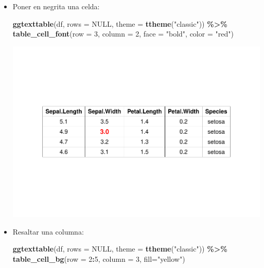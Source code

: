 \documentclass[
]{book}
\newenvironment{Shaded}{\begin{snugshade}}{\end{snugshade}}
\newcommand{\AttributeTok}[1]{\textcolor[rgb]{0.13,0.29,0.53}{#1}}
\newcommand{\ConstantTok}[1]{\textcolor[rgb]{0.56,0.35,0.01}{#1}}
\newcommand{\DecValTok}[1]{\textcolor[rgb]{0.00,0.00,0.81}{#1}}
\newcommand{\FunctionTok}[1]{\textcolor[rgb]{0.13,0.29,0.53}{\textbf{#1}}}
\newcommand{\NormalTok}[1]{#1}
\newcommand{\SpecialCharTok}[1]{\textcolor[rgb]{0.81,0.36,0.00}{\textbf{#1}}}
\newcommand{\StringTok}[1]{\textcolor[rgb]{0.31,0.60,0.02}{#1}}
\begin{document}
\begin{itemize}
\item
  Poner en negrita una celda:

\begin{Shaded}
\begin{Highlighting}[]
\FunctionTok{ggtexttable}\NormalTok{(df, }\AttributeTok{rows =} \ConstantTok{NULL}\NormalTok{,  }\AttributeTok{theme =} \FunctionTok{ttheme}\NormalTok{(}\StringTok{"classic"}\NormalTok{)) }\SpecialCharTok{\%\textgreater{}\%}  
  \FunctionTok{table\_cell\_font}\NormalTok{(}\AttributeTok{row =} \DecValTok{3}\NormalTok{, }\AttributeTok{column =} \DecValTok{2}\NormalTok{, }\AttributeTok{face =} \StringTok{"bold"}\NormalTok{, }\AttributeTok{color =} \StringTok{"red"}\NormalTok{)}
\end{Highlighting}
\end{Shaded}

  \includegraphics{_main_files/figure-latex/unnamed-chunk-234-1.pdf}
\item
  Resaltar una columna:

\begin{Shaded}
\begin{Highlighting}[]
\FunctionTok{ggtexttable}\NormalTok{(df, }\AttributeTok{rows =} \ConstantTok{NULL}\NormalTok{,  }\AttributeTok{theme =} \FunctionTok{ttheme}\NormalTok{(}\StringTok{"classic"}\NormalTok{)) }\SpecialCharTok{\%\textgreater{}\%} 
  \FunctionTok{table\_cell\_bg}\NormalTok{(}\AttributeTok{row =} \DecValTok{2}\SpecialCharTok{:}\DecValTok{5}\NormalTok{, }\AttributeTok{column =} \DecValTok{3}\NormalTok{, }\AttributeTok{fill=}\StringTok{"yellow"}\NormalTok{)}
\end{Highlighting}
\end{Shaded}


\end{itemize}
\end{document}
